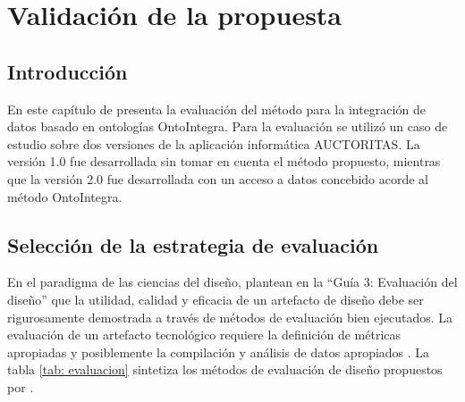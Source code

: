 \chapter{\large Validación de la propuesta}\label{Capítulo 3}

\pagestyle{fancy}
\lhead{}
\chead{}
\lfoot{}
\cfoot{}
\rfoot{\thepage}
\renewcommand{\headrulewidth}{0.4pt}
\vspace{-1cm}

\section{Introducción}
En este capítulo de presenta la evaluación del método para la integración de datos basado en ontologías OntoIntegra. Para la evaluación se utilizó un caso de estudio sobre dos versiones de la aplicación informática AUCTORITAS. La versión 1.0 fue desarrollada sin tomar en cuenta el método propuesto, mientras que la versión 2.0 fue desarrollada con un acceso a datos concebido acorde al método OntoIntegra.

\section{Selección de la estrategia de evaluación}
En el paradigma de las ciencias del diseño,\cite{Hevner:2004:DSI:2017212.2017217} plantean en la ``Guía 3: Evaluación del diseño'' que la utilidad, calidad y eficacia de un artefacto de diseño debe ser rigurosamente demostrada a través de métodos de evaluación bien ejecutados. La evaluación de un artefacto tecnológico requiere la definición de métricas apropiadas y posiblemente la compilación y análisis de datos apropiados \citep{Hevner:2004:DSI:2017212.2017217}. La tabla \ref{tab: evaluacion} sintetiza los métodos de evaluación de diseño propuestos por \cite{Hevner:2004:DSI:2017212.2017217}.

